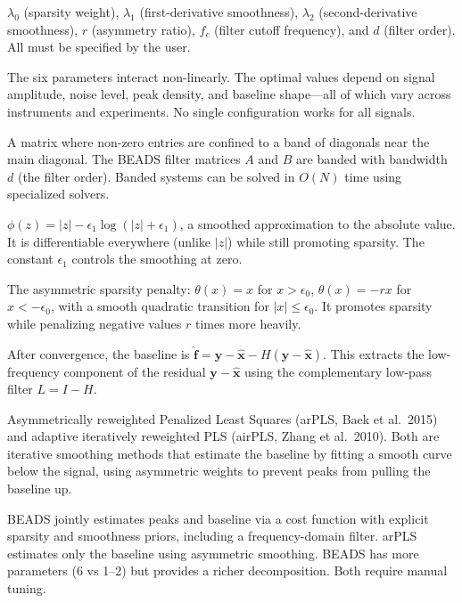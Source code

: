 \documentclass[11pt, letterpaper]{article}
\begin{document}
{$\lambda_0$ (sparsity weight), $\lambda_1$ (first-derivative smoothness), $\lambda_2$ (second-derivative smoothness), $r$ (asymmetry ratio), $f_c$ (filter cutoff frequency), and $d$ (filter order).  All must be specified by the user.}

{The six parameters interact non-linearly.  The optimal values depend on signal amplitude, noise level, peak density, and baseline shape---all of which vary across instruments and experiments.  No single configuration works for all signals.}

{A matrix where non-zero entries are confined to a band of diagonals near the main diagonal.  The BEADS filter matrices $A$ and $B$ are banded with bandwidth $d$ (the filter order).  Banded systems can be solved in $O(N)$ time using specialized solvers.}

{$\phi(z) = |z| - \epsilon_1 \log(|z| + \epsilon_1)$, a smoothed approximation to the absolute value.  It is differentiable everywhere (unlike $|z|$) while still promoting sparsity.  The constant $\epsilon_1$ controls the smoothing at zero.}

{The asymmetric sparsity penalty: $\theta(x) = x$ for $x > \epsilon_0$, $\theta(x) = -rx$ for $x < -\epsilon_0$, with a smooth quadratic transition for $|x| \leq \epsilon_0$.  It promotes sparsity while penalizing negative values $r$ times more heavily.}

{After convergence, the baseline is $\hat{\mathbf{f}} = \mathbf{y} - \hat{\mathbf{x}} - H(\mathbf{y} - \hat{\mathbf{x}})$.  This extracts the low-frequency component of the residual $\mathbf{y} - \hat{\mathbf{x}}$ using the complementary low-pass filter $L = I - H$.}

{Asymmetrically reweighted Penalized Least Squares (arPLS, Baek et al.\ 2015) and adaptive iteratively reweighted PLS (airPLS, Zhang et al.\ 2010).  Both are iterative smoothing methods that estimate the baseline by fitting a smooth curve below the signal, using asymmetric weights to prevent peaks from pulling the baseline up.}

{BEADS jointly estimates peaks and baseline via a cost function with explicit sparsity and smoothness priors, including a frequency-domain filter.  arPLS estimates only the baseline using asymmetric smoothing.  BEADS has more parameters (6 vs 1--2) but provides a richer decomposition.  Both require manual tuning.}
\end{document}
